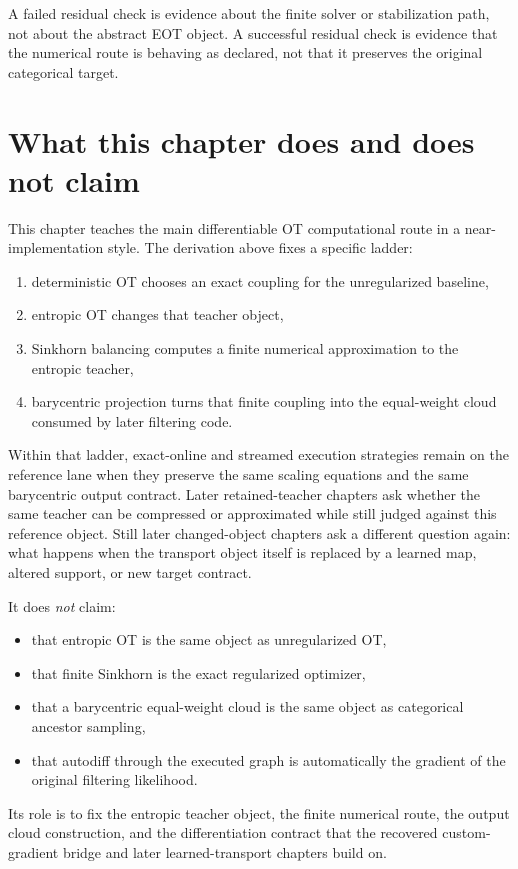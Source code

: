 A failed residual check is evidence about the finite solver or stabilization path,
not about the abstract EOT object.  A successful residual check is evidence that
the numerical route is behaving as declared, not that it preserves the original
categorical target.

\section{What this chapter does and does not claim}
\label{sec:bf-eot-boundary}

This chapter teaches the main differentiable OT computational route in a near-
implementation style.  The derivation above fixes a specific ladder:
\begin{enumerate}[label=(\roman*)]
  \item deterministic OT chooses an exact coupling for the unregularized baseline,
  \item entropic OT changes that teacher object,
  \item Sinkhorn balancing computes a finite numerical approximation to the entropic
    teacher,
  \item barycentric projection turns that finite coupling into the equal-weight
    cloud consumed by later filtering code.
\end{enumerate}
Within that ladder, exact-online and streamed execution strategies remain on the
reference lane when they preserve the same scaling equations and the same
barycentric output contract.  Later retained-teacher chapters ask whether the same
teacher can be compressed or approximated while still judged against this reference
object.  Still later changed-object chapters ask a different question again: what
happens when the transport object itself is replaced by a learned map, altered
support, or new target contract.

It does \emph{not} claim:
\begin{itemize}
  \item that entropic OT is the same object as unregularized OT,
  \item that finite Sinkhorn is the exact regularized optimizer,
  \item that a barycentric equal-weight cloud is the same object as categorical
  ancestor sampling,
  \item that autodiff through the executed graph is automatically the gradient of
    the original filtering likelihood.
\end{itemize}
Its role is to fix the entropic teacher object, the finite numerical route, the
output cloud construction, and the differentiation contract that the recovered
custom-gradient bridge and later learned-transport chapters build on.

